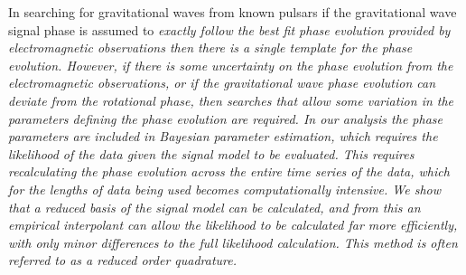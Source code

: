 In searching for gravitational waves from known pulsars if the gravitational wave signal phase is assumed to
\it{exactly} follow the best fit phase evolution provided by electromagnetic observations then there is a single
template for the phase evolution. However, if there is some uncertainty on the phase evolution from the
electromagnetic observations, or if the gravitational wave phase evolution can deviate from the rotational phase,
then searches that allow some variation in the parameters defining the phase evolution are required. In our
analysis the phase parameters are included in Bayesian parameter estimation, which requires the likelihood of the
data given the signal model to be evaluated. This requires recalculating the phase evolution across the entire
time series of the data, which for the lengths of data being used becomes computationally intensive. We show that
a reduced basis of the signal model can be calculated, and from this an empirical interpolant can allow the
likelihood to be calculated far more efficiently, with only minor differences to the full likelihood calculation.
This method is often referred to as a reduced order quadrature.
